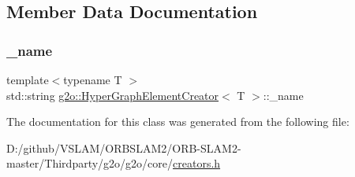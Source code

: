 \subsection{Member Data Documentation}
\mbox{\label{classg2o_1_1_hyper_graph_element_creator_abbcc42de74a57d80b586dd843255ebae}} 
\subsubsection{\texorpdfstring{\+\_\+name}{\_name}}
{\footnotesize\ttfamily template$<$typename T $>$ \\
std\+::string \mbox{\hyperlink{classg2o_1_1_hyper_graph_element_creator}{g2o\+::\+Hyper\+Graph\+Element\+Creator}}$<$ T $>$\+::\+\_\+name\hspace{0.3cm}{\ttfamily [protected]}}



The documentation for this class was generated from the following file\+:\begin{DoxyCompactItemize}
\item 
D\+:/github/\+V\+S\+L\+A\+M/\+O\+R\+B\+S\+L\+A\+M2/\+O\+R\+B-\/\+S\+L\+A\+M2-\/master/\+Thirdparty/g2o/g2o/core/\mbox{\hyperlink{creators_8h}{creators.\+h}}\end{DoxyCompactItemize}
